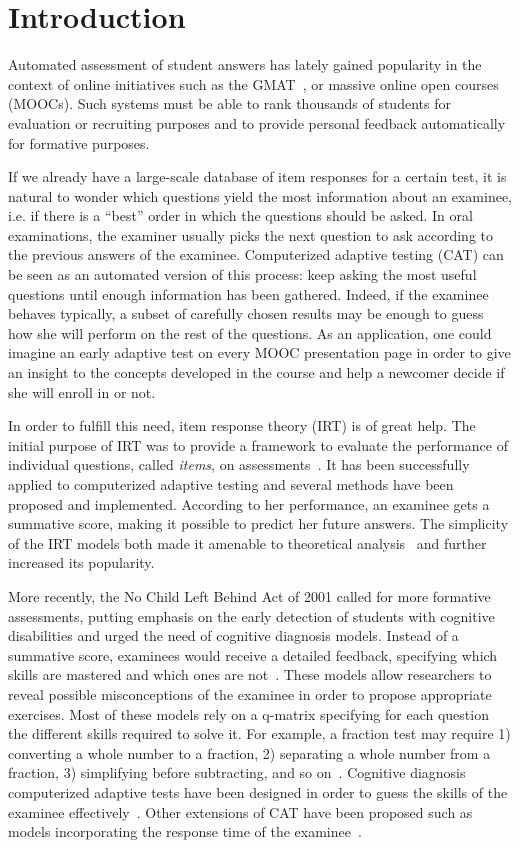 \documentclass{edm_template}
\begin{document}
\newpage

\section{Introduction}
Automated assessment of student answers has lately gained popularity in the context of online initiatives such as the GMAT~\cite{Rudner2010}, or massive online open courses (MOOCs). Such systems must be able to rank thousands of students for evaluation or recruiting purposes and to provide personal feedback automatically for formative purposes.

If we already have a large-scale database of item responses for a certain test, it is natural to wonder which questions yield the most information about an examinee, i.e. if there is a ``best'' order in which the questions should be asked. In oral examinations, the examiner usually picks the next question to ask according to the previous answers of the examinee. Computerized adaptive testing (CAT) can be seen as an automated version of this process: keep asking the most useful questions until enough information has been gathered. Indeed, if the examinee behaves typically, a subset of carefully chosen results may be enough to guess how she will perform on the rest of the questions. As an application, one could imagine an early adaptive test on every MOOC presentation page in order to give an insight to the concepts developed in the course and help a newcomer decide if she will enroll in or not.

In order to fulfill this need, item response theory (IRT) is of great help. The initial purpose of IRT was to provide a framework to evaluate the performance of individual questions, called \emph{items}, on assessments~\cite{Hambleton1991}. It has been successfully applied to computerized adaptive testing and several methods have been proposed and implemented. According to her performance, an examinee gets a summative score, making it possible to predict her future answers. The simplicity of the IRT models both made it amenable to theoretical analysis~\cite{Baker2004} and further increased its popularity.

More recently, the No Child Left Behind Act of 2001 called for more formative assessments, putting emphasis on the early detection of students with cognitive disabilities and urged the need of cognitive diagnosis models. Instead of a summative score, examinees would receive a detailed feedback, specifying which skills are mastered and which ones are not~\cite{Cheng2009}. These models allow researchers to reveal possible misconceptions of the examinee in order to propose appropriate exercises. Most of these models rely on a q-matrix specifying for each question the different skills required to solve it. For example, a fraction test may require 1) converting a whole number to a fraction, 2) separating a whole number from a fraction, 3) simplifying before subtracting, and so on~\cite{DeLaTorreDouglas2004}. Cognitive diagnosis computerized adaptive tests have been designed in order to guess the skills of the examinee effectively~\cite{Cheng2009}. Other extensions of CAT have been proposed such as models incorporating the response time of the examinee~\cite{Chang2014}.
\end{document}

